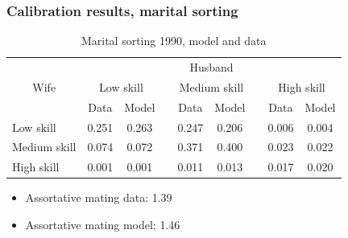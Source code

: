 \documentclass{beamer}
\begin{document}
\begin{frame}
	\frametitle{Calibration results, marital sorting}\label{frame:calib_results_ms}
	\scriptsize
	\begin{table}[]
		\centering
		\caption{Marital sorting 1990, model and data}
		\begin{tabular}{lcccccccc}
			\toprule
			\multicolumn{1}{c}{\multirow{3}[6]{*}{Wife}} & \multicolumn{8}{c}{Husband} \\
			\cmidrule{2-9}          & \multicolumn{2}{c}{Low skill} &       & \multicolumn{2}{c}{Medium skill} &       & \multicolumn{2}{c}{High skill} \\
			\cmidrule{2-3}\cmidrule{5-6}\cmidrule{8-9}          & Data  & Model &       & Data  & Model &       & Data  & Model \\
			\midrule
			Low skill & 0.251 & 0.263 &       & 0.247 & 0.206 &       & 0.006 & 0.004 \\
			Medium skill & 0.074 & 0.072 &       & 0.371 & 0.400 &       & 0.023 & 0.022 \\
			High skill & 0.001 & 0.001 &       & 0.011 & 0.013 &       & 0.017 & 0.020 \\
			\bottomrule
			\bottomrule
		\end{tabular}
	\end{table}
	
	\begin{itemize}
		\item Assortative mating data: 1.39
		\item Assortative mating model: 1.46
	\end{itemize}

	\hyperlink{appendix:ct_approach}{}	
\end{frame}
\end{document}
